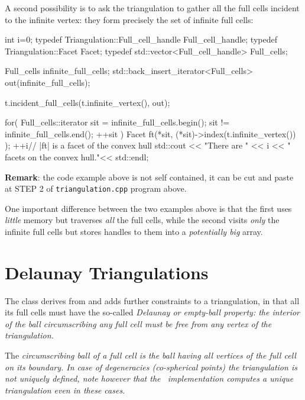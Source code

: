 A second possibility is to ask the triangulation to gather all the full cells
incident to the infinite vertex: they form precisely the set of infinite
full cells:

\begin{ccExampleCode}
{int i=0;
typedef Triangulation::Full_cell_handle Full_cell_handle;
typedef Triangulation::Facet Facet;
typedef std::vector<Full_cell_handle> Full_cells;

Full_cells infinite_full_cells;
std::back_insert_iterator<Full_cells> out(infinite_full_cells);

t.incident_full_cells(t.infinite_vertex(), out);

for( Full_cells::iterator sit = infinite_full_cells.begin(); 
       sit != infinite_full_cells.end(); ++sit ) {
    Facet ft(*sit, (*sit)->index(t.infinite_vertex()) );
    ++i// |ft| is a facet of the convex hull
}
std::cout << "There are " << i << " facets on the convex hull."<< std::endl;}
\end{ccExampleCode}
\textbf{Remark}: the code example above is not self contained, it can
be cut and paste at STEP 2 of {\tt triangulation.cpp} program above.

One important difference between the two examples above is that the first uses
\emph{little} memory but traverses \emph{all} the full cells, while the second
visits \emph{only} the infinite full cells but stores handles to them into a
\emph{potentially big} array.


\section{Delaunay Triangulations}%

The class  derives from
 and adds further constraints to a
triangulation, in that all its full cells must have the so-called
\em{Delaunay} or \em{empty-ball} property: the interior of the ball
circumscribing any full cell must be free from any vertex
of the triangulation.

The \em{circumscribing ball} of a full cell is the ball
having all vertices of the full cell on its boundary.
In case of degeneracies (co-spherical points) the triangulation is not
uniquely defined, 
note however that the \cgal\ implementation computes a unique
triangulation even in these cases. 

